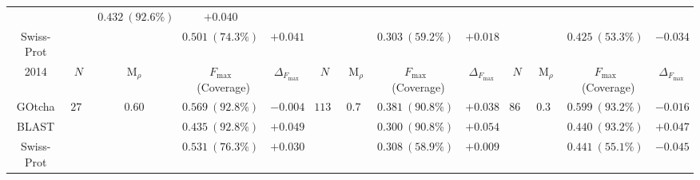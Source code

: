 \begin{tabular}{c|cccc|cccc|cccc}
& & $0.432~(92.6\%)$ & $+0.040$ \\
Swiss-Prot &
& & $0.501~(74.3\%)$ & $+0.041$ &
& & $0.303~(59.2\%)$ & $+0.018$ &
& & $0.425~(53.3\%)$ & $-0.034$ \\
\hline
2014 &
$N$ & $\mathrm{M}_{\rho}$ & $F_{\max}$~(Coverage) & $\Delta_{F_{\max}}$ &
$N$ & $\mathrm{M}_{\rho}$ & $F_{\max}$~(Coverage) & $\Delta_{F_{\max}}$ &
$N$ & $\mathrm{M}_{\rho}$ & $F_{\max}$~(Coverage) & $\Delta_{F_{\max}}$ \\ \hline 
GOtcha & 
\multirow{3}{*}{$279$} & \multirow{3}{*}{$0.60$} & $0.569~(92.8\%)$ & $-0.004$ &
\multirow{3}{*}{$1130$} & \multirow{3}{*}{$0.77$} & $0.381~(90.8\%)$ & $+0.038$ &
\multirow{3}{*}{$865$} & \multirow{3}{*}{$0.33$} & $0.599~(93.2\%)$ & $-0.016$ \\
BLAST &
& & $0.435~(92.8\%)$ & $+0.049$ &
& & $0.300~(90.8\%)$ & $+0.054$ &
& & $0.440~(93.2\%)$ & $+0.047$ \\
Swiss-Prot &
& & $0.531~(76.3\%)$ & $+0.030$ &
& & $0.308~(58.9\%)$ & $+0.009$ &
& & $0.441~(55.1\%)$ & $-0.045$ \\
\hline
\end{tabular}
